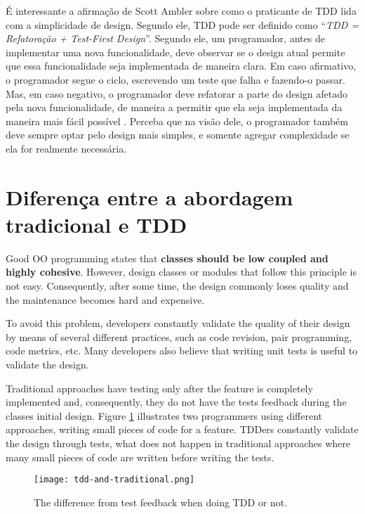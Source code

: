 É interessante a afirmação de Scott Ambler sobre como o praticante de TDD lida
com a simplicidade de design. Segundo ele, TDD pode ser definido como
``\textit{TDD = Refatoração + Test-First Design}''. Segundo ele, um programador,
antes de implementar uma nova funcionalidade, deve observar se o design atual
permite que essa funcionalidade seja implementada de maneira clara. Em caso
afirmativo, o programador segue o ciclo, escrevendo um teste que falha e
fazendo-o passar. Mas, em caso negativo, o programador deve refatorar a parte do
design afetado pela nova funcionalidade, de maneira a permitir que ela seja
implementada da maneira mais fácil possível \cite{wambler-tdd}. Perceba que na
visão dele, o programador também deve sempre optar pelo design mais simples, e
somente agregar complexidade se ela for realmente necessária.

\section{Diferença entre a abordagem tradicional e TDD}
\label{sec:diferencas-tdd-e-tradicional}

Good OO programming states that \textbf{classes should be low
coupled and highly cohesive}. However, design classes
or modules that follow this principle is
not easy. Consequently, after some time, the design commonly loses
quality and the maintenance becomes hard and expensive. 

To avoid this problem, developers constantly validate the 
quality of their design by means of several different practices, such as code
revision, pair programming, code metrics, etc. Many developers also believe that
writing unit tests is useful to validate the design. 

Traditional approaches have 
testing only after the feature is completely implemented and, consequently, 
they do not have the tests feedback during the classes initial design. Figure 
\ref{fig:tdd-feedback} illustrates two programmers using different approaches, 
writing small pieces of code for a feature. TDDers constantly validate the
design through tests, what does not happen in traditional approaches where many 
small pieces of code are written before writing the tests.

\begin{figure}[h!H]
  \centering
  \texttt{[image: tdd-and-traditional.png]}
  \caption{The difference from test feedback when doing TDD or not.}
  \label{fig:tdd-feedback}
\end{figure}